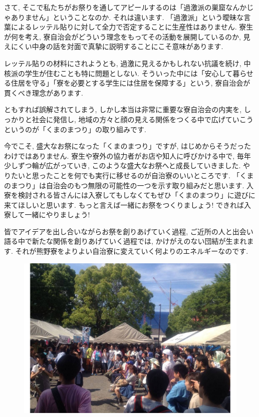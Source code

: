 \documentclass[10pt,b5jsbook,dvips,dvipdfmx,openany]{jsbook}
\theoremstyle{definition}
\begin{document}
 		さて, そこで私たちがお祭りを通してアピールするのは「過激派の巣窟なんかじゃありません」ということなのか. それは違います. 「過激派」という曖昧な言葉によるレッテル貼りに対して全力で否定することに生産性はありません. 寮生が何を考え, 寮自治会がどういう理念をもってその活動を展開しているのか, 見えにくい中身の話を対面で真摯に説明することにこそ意味があります.

 		レッテル貼りの材料にされようとも, 過激に見えるかもしれない抗議を続け, 中核派の学生が住むことも特に問題としない. そういった中には「安心して暮らせる住居を守る」「寮を必要とする学生には住居を保障する」という, 寮自治会が貫くべき理念があります.

 		ともすれば誤解されてしまう, しかし本当は非常に重要な寮自治会の内実を, しっかりと社会に発信し, 地域の方々と顔の見える関係をつくる中で広げていこうというのが「くまのまつり」の取り組みです.

		今でこそ, 盛大なお祭になった「くまのまつり」ですが, はじめからそうだったわけではありません. 寮生や寮外の協力者がお店や知人に呼びかける中で, 毎年少しずつ輪が広がっていき, このような盛大なお祭へと成長していきました. やりたいと思ったことを何でも実行に移せるのが自治寮のいいところです. 「くまのまつり」は自治会のもつ無限の可能性の一つを示す取り組みだと思います. 入寮を検討される皆さんには入寮してもしなくてもぜひ「くまのまつり」に遊びに来てほしいと思います. もっと言えば一緒にお祭をつくりましょう! できれば入寮して一緒にやりましょう!

		皆でアイデアを出し合いながらお祭を創りあげていく過程, ご近所の人と出会い語る中で新たな関係を創りあげていく過程では, かけがえのない団結が生まれます. それが熊野寮をよりよい自治寮に変えていく何よりのエネルギーなのです.
	\begin{figure}[h]
		\begin{flushleft}
 	 	\includegraphics[scale=0.3]{kumano_fes2.pdf}
		\end{flushleft}
		\end{figure}
\end{document}
